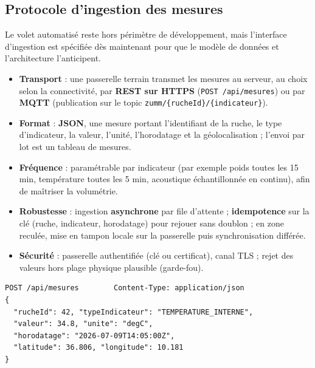 \subsection{Protocole d'ingestion des mesures}
Le volet automatisé reste hors périmètre de développement, mais l'interface
d'ingestion est spécifiée dès maintenant pour que le modèle de données et
l'architecture l'anticipent.
\begin{itemize}
  \item \textbf{Transport} : une passerelle terrain transmet les mesures au
        serveur, au choix selon la connectivité, par \textbf{REST sur HTTPS}
        (\texttt{POST /api/mesures}) ou par \textbf{MQTT} (publication sur le
        topic \texttt{zumm/\{rucheId\}/\{indicateur\}}).
  \item \textbf{Format} : \textbf{JSON}, une mesure portant l'identifiant de la
        ruche, le type d'indicateur, la valeur, l'unité, l'horodatage et la
        géolocalisation ; l'envoi par lot est un tableau de mesures.
  \item \textbf{Fréquence} : paramétrable par indicateur (par exemple poids
        toutes les 15 min, température toutes les 5 min, acoustique échantillonnée
        en continu), afin de maîtriser la volumétrie.
  \item \textbf{Robustesse} : ingestion \textbf{asynchrone} par file d'attente ;
        \textbf{idempotence} sur la clé (ruche, indicateur, horodatage) pour
        rejouer sans doublon ; en zone reculée, mise en tampon locale sur la
        passerelle puis synchronisation différée.
  \item \textbf{Sécurité} : passerelle authentifiée (clé ou certificat), canal
        TLS ; rejet des valeurs hors plage physique plausible (garde-fou).
\end{itemize}
\begin{verbatim}
POST /api/mesures        Content-Type: application/json
{
  "rucheId": 42, "typeIndicateur": "TEMPERATURE_INTERNE",
  "valeur": 34.8, "unite": "degC",
  "horodatage": "2026-07-09T14:05:00Z",
  "latitude": 36.806, "longitude": 10.181
}
\end{verbatim}


